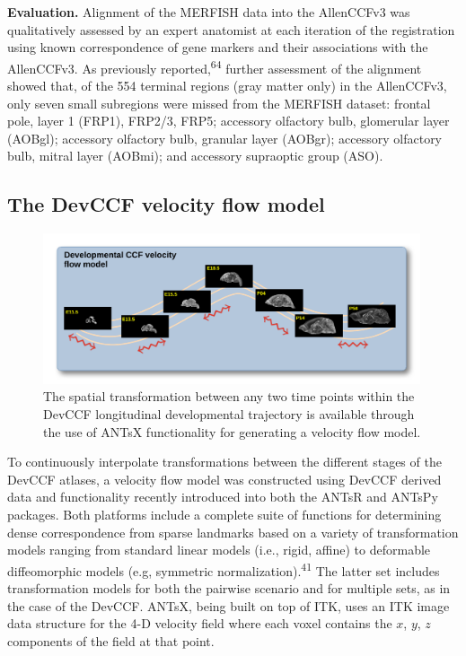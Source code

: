 \documentclass[
  12pt,
]{article}
\begin{document}
\textbf{Evaluation.} Alignment of the MERFISH data into the AllenCCFv3
was qualitatively assessed by an expert anatomist at each iteration of
the registration using known correspondence of gene markers and their
associations with the AllenCCFv3. As previously
reported,\textsuperscript{64} further assessment of the alignment showed
that, of the 554 terminal regions (gray matter only) in the AllenCCFv3,
only seven small subregions were missed from the MERFISH dataset:
frontal pole, layer 1 (FRP1), FRP2/3, FRP5; accessory olfactory bulb,
glomerular layer (AOBgl); accessory olfactory bulb, granular layer
(AOBgr); accessory olfactory bulb, mitral layer (AOBmi); and accessory
supraoptic group (ASO).

\hypertarget{the-devccf-velocity-flow-model-1}{%
\subsection{The DevCCF velocity flow
model}\label{the-devccf-velocity-flow-model-1}}

\begin{figure}
\centering
\includegraphics[width=0.99\textwidth]{Figures/lowerLeftPanel.pdf}
\caption{The spatial transformation between any two time points within the
DevCCF longitudinal developmental trajectory is available through the use of
ANTsX functionality for generating a velocity flow model.}
\label{fig:devccfvelocity}
\end{figure}

To continuously interpolate transformations between the different stages
of the DevCCF atlases, a velocity flow model was constructed using
DevCCF derived data and functionality recently introduced into both the
ANTsR and ANTsPy packages. Both platforms include a complete suite of
functions for determining dense correspondence from sparse landmarks
based on a variety of transformation models ranging from standard linear
models (i.e., rigid, affine) to deformable diffeomorphic models (e.g,
symmetric normalization).\textsuperscript{41} The latter set includes
transformation models for both the pairwise scenario and for multiple
sets, as in the case of the DevCCF. ANTsX, being built on top of ITK,
uses an ITK image data structure for the 4-D velocity field where each
voxel contains the \(x\), \(y\), \(z\) components of the field at that
point.
\end{document}
